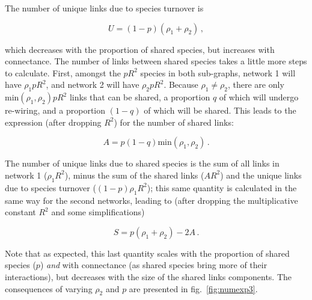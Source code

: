 \documentclass[10pt,oneside]{article}
\begin{document}
The number of unique links due to species turnover is

\[U = (1-p)(\rho_1 + \rho_2)\,,\]

which decreases with the proportion of shared species, but increases
with connectance. The number of links between shared species takes a
little more steps to calculate. First, amongst the \(pR^2\) species in
both sub-graphs, network 1 will have \(\rho_1 pR^2\), and network 2 will
have \(\rho_2 pR^2\). Because \(\rho_1 \neq \rho_2\), there are only
\(\text{min}(\rho_1, \rho_2)pR^2\) links that can be shared, a
proportion \(q\) of which will undergo re-wiring, and a proportion
\((1-q)\) of which will be shared. This leads to the expression (after
dropping \(R^2\)) for the number of shared links:

\[A = p (1-q) \text{min}(\rho_1, \rho_2)\,.\]

The number of unique links due to shared species is the sum of all links
in network 1 (\(\rho_1 R^2\)), minus the sum of the shared links
(\(AR^2\)) and the unique links due to species turnover
(\((1-p)\rho_1R^2\)); this same quantity is calculated in the same way
for the second networks, leading to (after dropping the multiplicative
constant \(R^2\) and some simplifications)

\[S = p (\rho_1 + \rho_2) - 2A\,.\]

Note that as expected, this last quantity scales with the proportion of
shared species (\(p\)) \emph{and} with connectance (as shared species
bring more of their interactions), but decreases with the size of the
shared links components. The consequences of varying \(\rho_2\) and
\(p\) are presented in fig.~\ref{fig:numexp3}.
\end{document}
